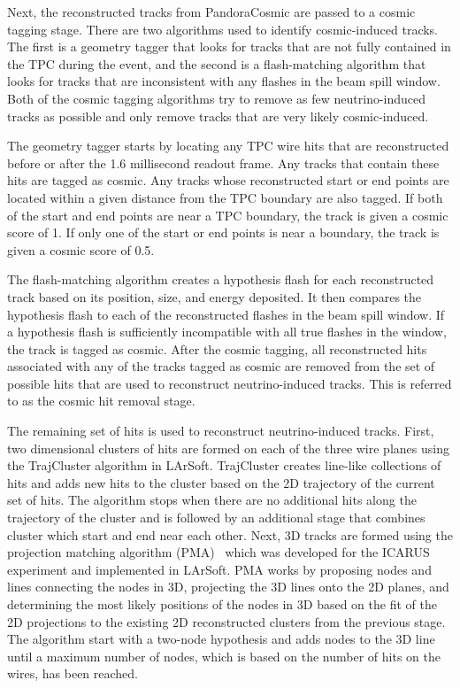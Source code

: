     Next, the reconstructed tracks from PandoraCosmic are passed to a cosmic
    tagging stage. There are two algorithms used to identify cosmic-induced
    tracks. The first is a geometry tagger that looks for tracks that are not
    fully contained in the TPC during the event, and the second is a
    flash-matching algorithm that looks for tracks that are inconsistent with
    any flashes in the beam spill window. Both of the cosmic tagging algorithms
    try to remove as few neutrino-induced tracks as possible and only remove
    tracks that are very likely cosmic-induced.
    
    The geometry tagger starts by locating any TPC wire hits that are
    reconstructed before or after the 1.6 millisecond readout frame. Any tracks
    that contain these hits are tagged as cosmic. Any tracks whose
    reconstructed start or end points are located within a given distance from
    the TPC boundary are also tagged. If both of the start and end points are
    near a TPC boundary, the track is given a cosmic score of 1. If only one of
    the start or end points is near a boundary, the track is given a cosmic
    score of 0.5.
    
    The flash-matching algorithm creates a hypothesis flash for each
    reconstructed track based on its position, size, and energy deposited. It
    then compares the hypothesis flash to each of the reconstructed flashes in
    the beam spill window. If a hypothesis flash is sufficiently incompatible
    with all true flashes in the window, the track is tagged as cosmic. After
    the cosmic tagging, all reconstructed hits associated with any of the
    tracks tagged as cosmic are removed from the set of possible hits that are
    used to reconstruct neutrino-induced tracks. This is referred to as the
    cosmic hit removal stage.

    The remaining set of hits is used to reconstruct neutrino-induced tracks.
    First, two dimensional clusters of hits are formed on each of the three
    wire planes using the TrajCluster algorithm in LArSoft. TrajCluster creates
    line-like collections of hits and adds new hits to the cluster based on the
    2D trajectory of the current set of hits.  The algorithm stops when there
    are no additional hits along the trajectory of the cluster and is followed
    by an additional stage that combines cluster which start and end near each
    other. Next, 3D tracks are formed using the projection matching algorithm
    (PMA)~\cite{Antonello:2012hu} which was developed for the ICARUS experiment
    and implemented in LArSoft. PMA works by proposing nodes and lines
    connecting the nodes in 3D, projecting the 3D lines onto the 2D planes, and
    determining the most likely positions of the nodes in 3D based on the fit
    of the 2D projections to the existing 2D reconstructed clusters from the
    previous stage. The algorithm start with a two-node hypothesis and adds
    nodes to the 3D line until a maximum number of nodes, which is based on the
    number of hits on the wires, has been reached.

